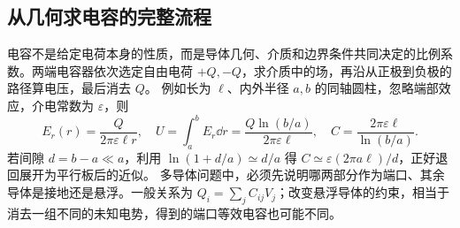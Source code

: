 \subsection{从几何求电容的完整流程}
电容不是给定电荷本身的性质，而是导体几何、介质和边界条件共同决定的比例系数。两端电容器依次选定自由电荷 $+Q,-Q$，求介质中的场，再沿从正极到负极的路径算电压，最后消去 $Q$。
例如长为 $\ell$、内外半径 $a,b$ 的同轴圆柱，忽略端部效应，介电常数为 $\varepsilon$，则
\[
 E_r(r)=\frac{Q}{2\pi\varepsilon\ell r},\quad
 U=\int_a^b E_r\dd r=\frac{Q\ln(b/a)}{2\pi\varepsilon\ell},\quad
 C=\frac{2\pi\varepsilon\ell}{\ln(b/a)}.
\]
若间隙 $d=b-a\ll a$，利用 $\ln(1+d/a)\simeq d/a$ 得
$C\simeq\varepsilon(2\pi a\ell)/d$，正好退回展开为平行板后的近似。
多导体问题中，必须先说明哪两部分作为端口、其余导体是接地还是悬浮。一般关系为 $Q_i=\sum_j C_{ij}V_j$；改变悬浮导体的约束，相当于消去一组不同的未知电势，得到的端口等效电容也可能不同。

